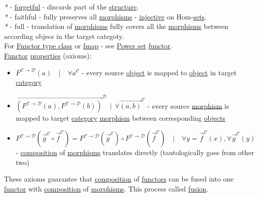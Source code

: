 \documentclass[a4paper,14pt,oneside]{book}
\begin{document}
\emph{*} - \hyperref[orge4f11ea]{forgetful} - discards part of the \hyperref[org69a0665]{structure}.\\
\emph{*} - faithful - fully preserves all \hyperref[org801ca09]{morphisms} - \hyperref[orgbd9aca7]{injective} on Hom-\hyperref[org6681e41]{sets}.\\
\emph{*} - full - translation of \hyperref[org801ca09]{morphisms} fully covers all the \hyperref[org801ca09]{morphisms} between according objecs in the target categoty.\\

For \hyperref[org112d285]{Functor type class} or \hyperref[org52090d5]{fmap} - see \hyperref[org8596c2b]{Power set} \hyperref[org4ae20fc]{functor}.\\

\hyperref[org4ae20fc]{Functor} \hyperref[orge2c24e7]{properties} (axioms):\\
\begin{itemize}
\item \(F^{\mathcal{C \to D}}(a) \quad | \quad \forall a^{\mathcal{C}}\) - every source \hyperref[org920c789]{object} is mapped to \hyperref[org920c789]{object} in target \hyperref[org74d6ac5]{category}\\
\item \(\overrightarrow{(F^{\mathcal{C \to D}}(a),F^{\mathcal{C \to D}}(b))}^{\mathcal{D}} \ \ | \ \ \forall \overrightarrow{(a, b)}^{\mathcal{C}}\) - every source \hyperref[orga7d420f]{morphism} is mapped to target \hyperref[org74d6ac5]{category} \hyperref[orga7d420f]{morphism} between corresponding \hyperref[orgc973d87]{objects}\\
\item \(F^{\mathcal{C \to D}}(\overrightarrow{g}^{\mathcal{C}} \circ \overrightarrow{f}^{\mathcal{C}}) = F^{\mathcal{C \to D}}(\overrightarrow{g}^{\mathcal{C}}) \circ F^{\mathcal{C \to D}}(\overrightarrow{f}^{\mathcal{C}}) \quad | \quad \forall y=\overrightarrow{f}^{\mathcal{C}}(x), \forall \overrightarrow{g}^{\mathcal{C}}(y)\) - \hyperref[orgde6ed92]{composition} of \hyperref[org801ca09]{morphisms} translates directly (tautologically goes from other two)\\
\end{itemize}

These axioms guarantee that \hyperref[orgde6ed92]{composition} of \hyperref[org7eee6bb]{functors} can be fused into one \hyperref[org4ae20fc]{functor} with \hyperref[orgde6ed92]{composition} of \hyperref[org801ca09]{morphisms}. This process called \hyperref[org32efe53]{fusion}.\\
\end{document}
